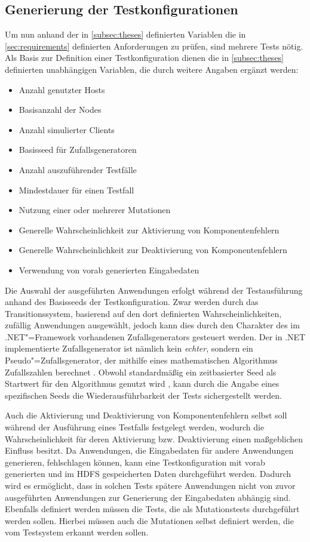 \subsection{Generierung der Testkonfigurationen}
\label{subsec:testcaseGeneration}

Um nun anhand der in \cref{subsec:theses} definierten Variablen die in \cref{sec:requirements} definierten Anforderungen zu prüfen, sind mehrere Tests nötig.
Als Basis zur Definition einer Testkonfiguration dienen die in \cref{subsec:theses} definierten unabhängigen Variablen, die durch weitere Angaben ergänzt werden:

\begin{itemize}
    \item Anzahl genutzter Hosts
    \item Basisanzahl der Nodes
    \item Anzahl simulierter Clients
    \item Basisseed für Zufallsgeneratoren
    \item Anzahl auszuführender Testfälle
    \item Mindestdauer für einen Testfall
    \item Nutzung einer oder mehrerer Mutationen
    \item Generelle Wahrscheinlichkeit zur Aktivierung von Komponentenfehlern
    \item Generelle Wahrscheinlichkeit zur Deaktivierung von Komponentenfehlern
    \item Verwendung von vorab generierten Eingabedaten
\end{itemize}

Die Auswahl der ausgeführten Anwendungen erfolgt während der Testausführung anhand des Basisseeds der Testkonfiguration.
Zwar werden durch das Transitionssystem, basierend auf den dort definierten Wahrscheinlichkeiten, zufällig Anwendungen ausgewählt, jedoch kann dies durch den Charakter des im .NET"=Framework vorhandenen Zufallsgenerators gesteuert werden.
Der in .NET implementierte Zufallsgenerator ist nämlich kein \emph{echter}, sondern ein Pseudo"=Zufallsgenerator, der mithilfe eines mathematischen Algorithmus Zufallszahlen berechnet \cite{RandomClassDoc}.
Obwohl standardmäßig ein zeitbasierter Seed als Startwert für den Algorithmus genutzt wird \cite{RandomClassDoc}, kann durch die Angabe eines spezifischen Seeds die Wiederausführbarkeit der Tests sichergestellt werden.

Auch die Aktivierung und Deaktivierung von Komponentenfehlern selbst soll während der Ausführung eines Testfalls festgelegt werden, wodurch die Wahrscheinlichkeit für deren Aktivierung bzw. Deaktivierung einen maßgeblichen Einfluss besitzt.
Da Anwendungen, die Eingabedaten für andere Anwendungen generieren, \uU fehlschlagen können, kann eine Testkonfiguration mit vorab generierten und im HDFS gespeicherten Daten durchgeführt werden.
Dadurch wird es ermöglicht, dass in solchen Tests spätere Anwendungen nicht von zuvor ausgeführten Anwendungen zur Generierung der Eingabedaten abhängig sind.
Ebenfalls definiert werden müssen die Tests, die als Mutationstests durchgeführt werden sollen.
Hierbei müssen auch die Mutationen selbst definiert werden, die vom Testsystem erkannt werden sollen.

